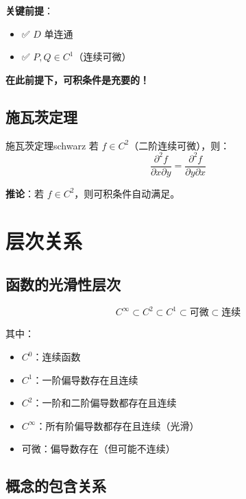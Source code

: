 \documentclass[12pt,a4paper]{article}
\begin{document}
\begin{keypoint}
\textbf{关键前提}：
\begin{itemize}
\item ✅ $D$ 单连通
\item ✅ $P, Q \in C^1$（连续可微）
\end{itemize}

\textbf{在此前提下，可积条件是充要的！}
\end{keypoint}

\subsection{施瓦茨定理}

\begin{theorem}{施瓦茨定理}{schwarz}
若 $f \in C^2$（二阶连续可微），则：
\begin{equation}
\frac{\partial^2 f}{\partial x \partial y} = \frac{\partial^2 f}{\partial y \partial x}
\end{equation}
\end{theorem}

\begin{keypoint}
\textbf{推论}：若 $f \in C^2$，则可积条件自动满足。
\end{keypoint}

\section{层次关系}

\subsection{函数的光滑性层次}

\begin{equation}
C^\infty \subset C^2 \subset C^1 \subset \text{可微} \subset \text{连续}
\end{equation}

其中：
\begin{itemize}
\item $C^0$：连续函数
\item $C^1$：一阶偏导数存在且连续
\item $C^2$：一阶和二阶偏导数都存在且连续
\item $C^\infty$：所有阶偏导数都存在且连续（光滑）
\item 可微：偏导数存在（但可能不连续）
\end{itemize}

\subsection{概念的包含关系}
\end{document}
